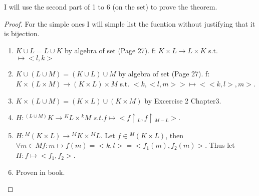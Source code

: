 I will use the second part of 1 to 6 (on the set) to prove the theorem.
\begin{proof} For the simple ones I will simple list the fucntion without justifying that it is bijection.
    \begin{enumerate}
        \item \(K \cup L = L \cup K\) by algebra of set (Page 27). f: \(K \times L \rightarrow L \times K\) s.t. \(<k, l> \mapsto <l, k>\)
        \item \(K \cup (L \cup M) = (K \cup L) \cup M\) by algebra of set (Page 27). f: \(K \times (L \times M) \rightarrow (K \times L) \times M\) s.t. \(<k, <l, m>> \mapsto <<k, l>, m>\).
        \item \(K \times (L \cup M) = (K \times L) \cup (K \times M)\) by Excercise 2 Chapter3.
        \item \(H: {}^{(L \cup M)} K \rightarrow {}^K L \times {}^k M\) \(s.t. f \mapsto <f \upharpoonright {}_L, f \upharpoonright {}_{M - L}>\).
        \item \(H: {}^M (K \times L) \rightarrow {}^M K \times {}^M L\). Let \(f \in {}^M (K \times L) \), then \(\forall m \in M f: m \mapsto f(m) = <k, l> = <f_1(m), f_2(m)>\). Thus let \(H: f \mapsto <f_1, f_2>\).
        \item Proven in book. 
    \end{enumerate}
\end{proof}

